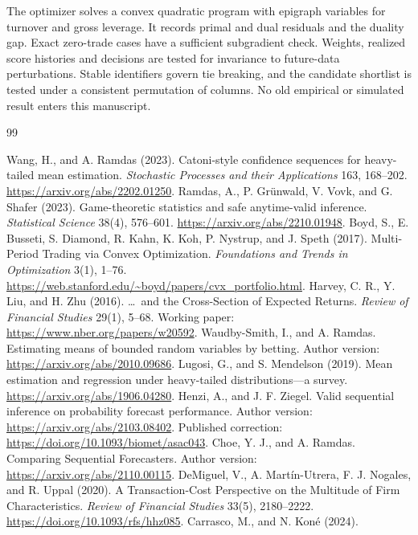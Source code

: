 \documentclass[11pt,a4paper]{article}
\theoremstyle{remark}\newtheorem{remark}[theorem]{Remark}
\begin{document}
The optimizer solves a convex quadratic program with epigraph variables for
turnover and gross leverage. It records primal and dual residuals and the
duality gap. Exact zero-trade cases have a sufficient subgradient check.
Weights, realized score histories and decisions are tested for invariance to
future-data perturbations. Stable identifiers govern tie breaking, and the
candidate shortlist is tested under a consistent permutation of columns.
No old empirical or simulated result enters this manuscript.

\endgroup
\begingroup\fontsize{9.5}{11}\selectfont
\begin{thebibliography}{99}
\setlength{\itemsep}{0pt}
\raggedright
{} Wang, H., and A. Ramdas (2023).
Catoni-style confidence sequences for heavy-tailed mean estimation.
\emph{Stochastic Processes and their Applications} 163, 168--202.
\url{https://arxiv.org/abs/2202.01250}.
 Ramdas, A., P. Gr\"unwald, V. Vovk, and G. Shafer (2023).
Game-theoretic statistics and safe anytime-valid inference.
\emph{Statistical Science} 38(4), 576--601.
\url{https://arxiv.org/abs/2210.01948}.
 Boyd, S., E. Busseti, S. Diamond, R. Kahn, K. Koh,
P. Nystrup, and J. Speth (2017). Multi-Period Trading via Convex Optimization.
\emph{Foundations and Trends in Optimization} 3(1), 1--76.
\url{https://web.stanford.edu/~boyd/papers/cvx_portfolio.html}.
 Harvey, C. R., Y. Liu, and H. Zhu (2016).
\ldots\ and the Cross-Section of Expected Returns.
\emph{Review of Financial Studies} 29(1), 5--68.
Working paper: \url{https://www.nber.org/papers/w20592}.
 Waudby-Smith, I., and A. Ramdas.
Estimating means of bounded random variables by betting.
Author version: \url{https://arxiv.org/abs/2010.09686}.
 Lugosi, G., and S. Mendelson (2019).
Mean estimation and regression under heavy-tailed distributions---a survey.
\url{https://arxiv.org/abs/1906.04280}.
 Henzi, A., and J. F. Ziegel.
Valid sequential inference on probability forecast performance.
Author version: \url{https://arxiv.org/abs/2103.08402}.
Published correction: \url{https://doi.org/10.1093/biomet/asac043}.
 Choe, Y. J., and A. Ramdas.
Comparing Sequential Forecasters.
Author version: \url{https://arxiv.org/abs/2110.00115}.
 DeMiguel, V., A. Mart\'in-Utrera, F. J. Nogales,
and R. Uppal (2020).
A Transaction-Cost Perspective on the Multitude of Firm Characteristics.
\emph{Review of Financial Studies} 33(5), 2180--2222.
\url{https://doi.org/10.1093/rfs/hhz085}.
 Carrasco, M., and N. Kon\'e (2024).

\end{thebibliography}
\end{document}
